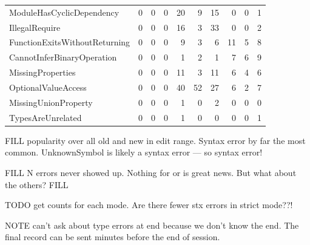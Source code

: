 \documentclass[english,submission,cleveref]{programming}
\begin{document}
\begin{table}[t]
\begin{tabular}{lr@{}r@{}rr@{}r@{}rr@{}r@{}r}
      ModuleHasCyclicDependency & {0} & {0} & {0} & {20} & {9} & {15} & {0} & {0} & {1} \\
      IllegalRequire & {0} & {0} & {0} & {16} & {3} & {33} & {0} & {0} & {2} \\
      FunctionExitsWithoutReturning & {0} & {0} & {0} & {9} & {3} & {6} & {11} & {5} & {8} \\
      CannotInferBinaryOperation & {0} & {0} & {0} & {1} & {2} & {1} & {7} & {6} & {9} \\
      MissingProperties & {0} & {0} & {0} & {11} & {3} & {11} & {6} & {4} & {6} \\
      OptionalValueAccess & {0} & {0} & {0} & {40} & {52} & {27} & {6} & {2} & {7} \\
      MissingUnionProperty & {0} & {0} & {0} & {1} & {0} & {2} & {0} & {0} & {0} \\
      TypesAreUnrelated & {0} & {0} & {0} & {1} & {0} & {0} & {0} & {0} & {1} \\
    \end{tabular}

\end{table}

FILL popularity over all old and new in edit range.
Syntax error by far the most common.
UnknownSymbol is likely a syntax error --- so  syntax error!

FILL N errors never showed up.
Nothing for  or  is great news.
But what about the others? FILL

TODO get counts for each mode. Are there fewer stx errors in strict mode??!

NOTE can't ask about type errors at end because we don't know
the end.
The final record can be sent minutes before the end of session.
\end{document}
